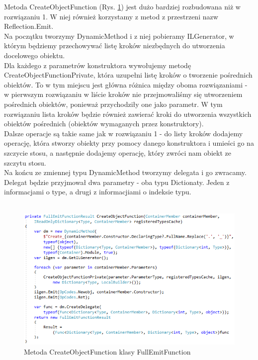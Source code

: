 \documentclass[12pt]{article}
\begin{document}
Metoda CreateObjectFunction (Rys. \ref{fig:FullEmitFunction_CreateObjectFunction}) jest dużo bardziej rozbudowana niż w rozwiązaniu 1. W niej również korzystamy z metod z przestrzeni nazw Reflection.Emit.\\
Na początku tworzymy DynamicMethod i z niej pobieramy ILGenerator, w którym będziemy przechowywać listę kroków niezbędnych do utworzenia docelowego obiektu.\\
Dla każdego z parametrów konstruktora wywołujemy metodę CreateObjectFunctionPrivate, która uzupełni listę kroków o tworzenie pośrednich obiektów. To w tym miejscu jest główna różnica między oboma rozwiązaniami - w pierwszym rozwiązaniu w liście kroków nie przejmowaliśmy się utworzeniem pośrednich obiektów, ponieważ przychodziły one jako parametr. W tym rozwiązaniu lista kroków będzie również zawierać kroki do utworzenia wszystkich obiektów pośrednich (obiektów wymaganych przez konstruktory).\\
Dalsze operacje są takie same jak w rozwiązaniu 1 - do listy kroków dodajemy operację, która stworzy obiekty przy pomocy danego konstruktora i umieści go na szczycie stosu, a następnie dodajemy operację, który zwróci nam obiekt ze szczytu stosu.\\
Na końcu ze zmiennej typu DynamicMethod tworzymy delegata i go zwracamy. Delegat będzie przyjmował dwa parametry - oba typu Dictionaty. Jeden z informacjami o type, a drugi z informacjiami o indeksie typu.\\ \\
\begin{figure}[H]
	\begin{center}
  		\includegraphics{FullEmitFunction_CreateObjectFunction.png}
  		\caption{Metoda CreateObjectFunction klasy FullEmitFunction}
  		\label{fig:FullEmitFunction_CreateObjectFunction}
	\end{center}
\end{figure}
\end{document}
